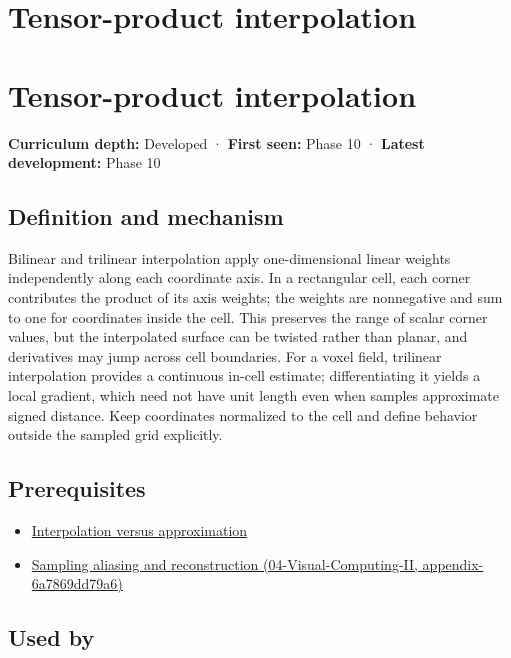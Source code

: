 \hypertarget{appendix-0a09b6dfdc86}{}
\section*{Tensor-product interpolation}
\section{Tensor-product interpolation}\label{tensor-product-interpolation}

\textbf{Curriculum depth:} Developed · \textbf{First seen:} Phase 10 · \textbf{Latest development:} Phase 10

\subsection{Definition and mechanism}\label{definition-and-mechanism}

Bilinear and trilinear interpolation apply one-dimensional linear weights independently along each coordinate axis. In a rectangular cell, each corner contributes the product of its axis weights; the weights are nonnegative and sum to one for coordinates inside the cell. This preserves the range of scalar corner values, but the interpolated surface can be twisted rather than planar, and derivatives may jump across cell boundaries. For a voxel field, trilinear interpolation provides a continuous in-cell estimate; differentiating it yields a local gradient, which need not have unit length even when samples approximate signed distance. Keep coordinates normalized to the cell and define behavior outside the sampled grid explicitly.

\subsection{Prerequisites}\label{prerequisites}

\begin{itemize}
\tightlist
\item
  \hyperref[appendix-0c2a5f69851e]{Interpolation versus approximation}
\item
  \href{}{Sampling aliasing and reconstruction (04-Visual-Computing-II, appendix-6a7869dd79a6)}
\end{itemize}

\subsection{Used by}\label{used-by}

